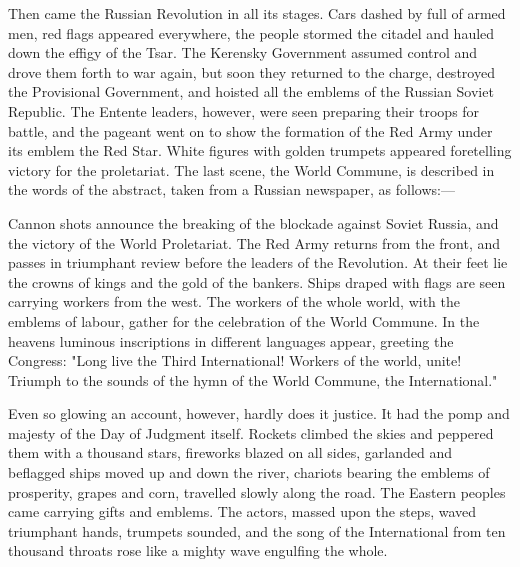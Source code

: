 Then came the Russian Revolution in all its stages. Cars dashed by full of armed men, red flags appeared everywhere, the people stormed the citadel and hauled down the effigy of the Tsar. The Kerensky Government assumed control and drove them forth to war again, but soon they returned to the charge, destroyed the Provisional Government, and hoisted all the emblems of the Russian Soviet Republic. The Entente leaders, however, were seen preparing their troops for battle, and the pageant went on to show the formation of the Red Army under its emblem the Red Star. White figures with golden trumpets appeared foretelling victory for the proletariat. The last scene, the World Commune, is described in the words of the abstract, taken from a Russian newspaper, as follows:---
\begin{displayquote}
Cannon shots announce the breaking of the blockade against Soviet Russia, and the victory of the World Proletariat. The Red Army returns from the front, and passes in triumphant review before the leaders of the Revolution. At their feet lie the crowns of kings and the gold of the bankers. Ships draped with flags are seen carrying workers from the west. The workers of the whole world, with the emblems of labour, gather for the celebration of the World Commune. In the heavens luminous inscriptions in different languages appear, greeting the Congress: "Long live the Third International! Workers of the world, unite! Triumph to the sounds of the hymn of the World Commune, the International."
\end{displayquote}
Even so glowing an account, however, hardly does it justice. It had the pomp and majesty of the Day of Judgment itself. Rockets climbed the skies and peppered them with a thousand stars, fireworks blazed on all sides, garlanded and beflagged ships moved up and down the river, chariots bearing the emblems of prosperity, grapes and corn, travelled slowly along the road. The Eastern peoples came carrying gifts and emblems. The actors, massed upon the steps, waved triumphant hands, trumpets sounded, and the song of the International from ten thousand throats rose like a mighty wave engulfing the whole.

